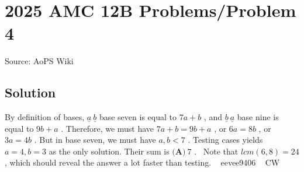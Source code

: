 \documentclass[12pt]{article}
\begin{document}
\section*{{2025 AMC 12B Problems/Problem 4}}
Source: AoPS Wiki

\subsection*{Solution}
By definition of bases, $\underline{a}~\underline{b}$ base seven is equal to $7a+b$ , and $\underline{b}~\underline{a}$ base nine is equal to $9b+a$ . Therefore, we must have $7a+b=9b+a$ , or $6a=8b$ , or $3a=4b$ . But in base seven, we must have $a,b<7$ . Testing cases yields $a=4,b=3$ as the only solution. Their sum is $\boxed{\textbf{(A)}~7}$ . ~Note that $lcm(6,8) = 24$ , which should reveal the answer a lot faster than testing. ~ eevee9406 ~ CW
\end{document}
